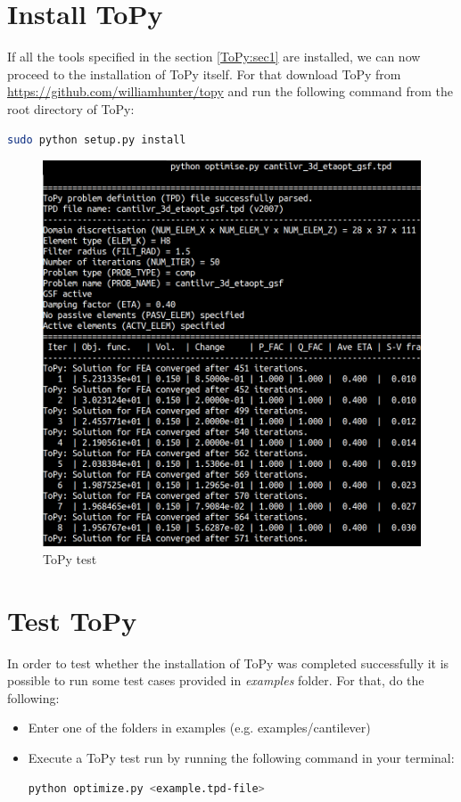 \documentclass[11pt,a4paper,article,bibtotoc,idxtotoc,headsepline,footsepline,footexclude,DIV13,oneside]{scrbook}
\begin{document}
	\section{Install ToPy}
	If all the tools specified in the section \ref{ToPy:sec1} are installed, we can now proceed to the installation of ToPy itself. For that download ToPy from \href{https://github.com/williamhunter/topy}{https://github.com/williamhunter/topy} and run the following command from the root directory of ToPy:
\begin{lstlisting}[language=bash]
sudo python setup.py install
\end{lstlisting}	
	\begin{figure}
	\centering
	\includegraphics[scale=0.2]{img/ToPy_ExampleRun.png}
	\caption{ToPy test}
	\label{fig:ToPy_test}
	\end{figure}


	\section{Test ToPy}
	In order to test whether the installation of ToPy was completed successfully it is possible to run some test cases provided in \textit{examples} folder. For that, do the following:
	\begin{itemize}
	\item Enter one of the folders in examples (e.g. examples/cantilever)
	\item Execute a ToPy test run by running the following command in your terminal:
\begin{lstlisting}[language=bash]
python optimize.py <example.tpd-file>
\end{lstlisting}	
	\end{itemize}
	
\end{document}

